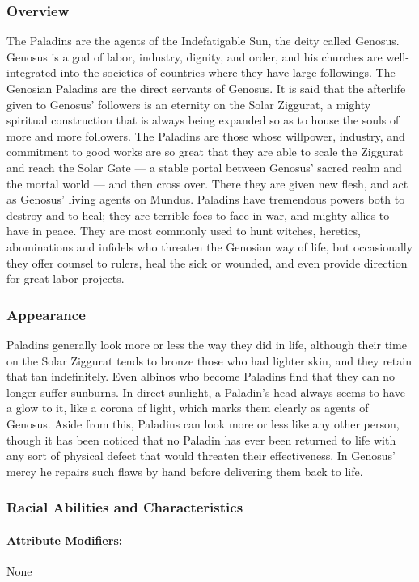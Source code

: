 \documentclass[oneside,11pt,english]{book}
\begin{document}
\subsubsection*{Overview} 
The Paladins are the agents of the Indefatigable Sun, the deity called Genosus. Genosus is a god of labor, 
industry, dignity, and order, and his churches are well-integrated into the societies of countries where they 
have large followings. The Genosian Paladins are the direct servants of Genosus. It is said that the 
afterlife given to Genosus' followers is an eternity on the Solar Ziggurat, a mighty spiritual construction 
that is always being expanded so as to house the souls of more and more followers. The Paladins are those 
whose willpower, industry, and commitment to good works are so great that they are able to scale the 
Ziggurat and reach the Solar Gate — a stable portal between Genosus' sacred realm and the mortal world — and then cross over. There they are given new flesh, and act as Genosus' living agents on Mundus. 
Paladins have tremendous powers both to destroy and to heal; they are terrible foes to face in war, and 
mighty allies to have in peace. They are most commonly used to hunt witches, heretics, abominations and 
infidels who threaten the Genosian way of life, but occasionally they offer counsel to rulers, heal the sick 
or wounded, and even provide direction for great labor projects. 


\subsubsection*{Appearance} 
Paladins generally look more or less the way they did in life, although their time on the Solar Ziggurat 
tends to bronze those who had lighter skin, and they retain that tan indefinitely. Even albinos who become 
Paladins find that they can no longer suffer sunburns. In direct sunlight, a Paladin's head always seems to 
have a glow to it, like a corona of light, which marks them clearly as agents of Genosus. Aside from this, 
Paladins can look more or less like any other person, though it has been noticed that no Paladin has ever 
been returned to life with any sort of physical defect that would threaten their effectiveness. In Genosus' 
mercy he repairs such flaws by hand before delivering them back to life. 
\subsubsection*{Racial Abilities and Characteristics} 
\paragraph{Attribute Modifiers:} None 
\end{document}
